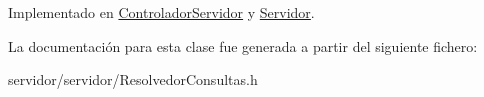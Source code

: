 \-Implementado en \hyperlink{classControladorServidor_a1ca5d73913116531b23e8c998f51f18b}{\-Controlador\-Servidor} y \hyperlink{classServidor_a0ec43bd5d9e7c4e36149ba9c00198950}{\-Servidor}.



\-La documentación para esta clase fue generada a partir del siguiente fichero\-:\begin{DoxyCompactItemize}
\item 
servidor/servidor/\-Resolvedor\-Consultas.\-h\end{DoxyCompactItemize}
